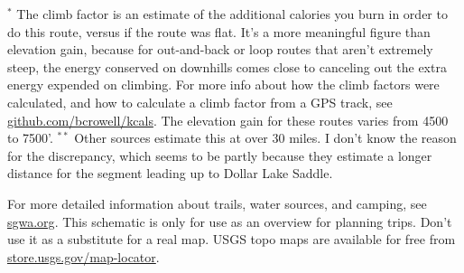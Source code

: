 \documentclass{san-g}
\begin{document}
${}^*$ \scriptsize{The climb factor is an estimate of the additional calories you burn
in order to do this route, versus if the route was flat.
It's a more meaningful figure than elevation gain, because for
out-and-back or loop routes that aren't extremely steep, the energy conserved on
downhills comes close to canceling out the extra energy expended on climbing. For more
info about how the climb factors were calculated, and how to calculate
a climb factor from a GPS track, see \url{github.com/bcrowell/kcals}. The elevation gain for
these routes varies from 4500 to 7500'.
}
${}^{**}$ \scriptsize{Other sources estimate this at over 30 miles. I don't know the reason
for the discrepancy, which seems to be partly because they estimate a longer distance
for the segment leading up to Dollar Lake Saddle.
}

\vspace{10mm}

\normalsize For more detailed information about trails, water sources, and camping, see \url{sgwa.org}.
This schematic is only for use as an overview for planning trips. Don't use it as a substitute
for a real map. USGS topo maps are available for free from \url{store.usgs.gov/map-locator}.

\vfill

\myfooter
\end{document}
